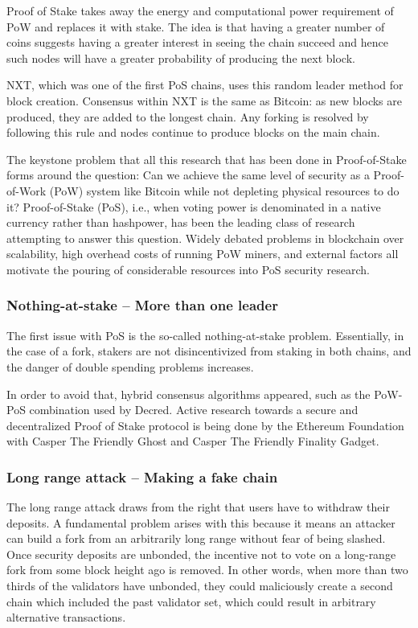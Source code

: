 \documentclass[a4paper]{article}
\begin{document}
	Proof of Stake takes away the energy and computational power requirement of PoW and replaces it with stake.\cite{ethfaq} The idea is that having a greater number of coins suggests having a greater interest in seeing the chain succeed and hence such nodes will have a greater probability of producing the next block.
	
	NXT, which was one of the first PoS chains, uses this random leader method for block creation. Consensus within NXT is the same as Bitcoin: as new blocks are produced, they are added to the longest chain. Any forking is resolved by following this rule and nodes continue to produce blocks on the main chain.
	
	The keystone problem that all this research that has been done in Proof-of-Stake forms around the question: Can we achieve the same level of security as a Proof-of-Work (PoW) system like Bitcoin while not depleting physical resources to do it? Proof-of-Stake (PoS), i.e., when voting power is denominated in a native currency rather than hashpower, has been the leading class of research attempting to answer this question. Widely debated problems in blockchain over scalability, high overhead costs of running PoW miners, and external factors all motivate the pouring of considerable resources into PoS security research.
	
	\subsubsection{Nothing-at-stake -- More than one leader}
	The first issue with PoS is the so-called nothing-at-stake problem. Essentially, in the case of a fork, stakers are not disincentivized from staking in both chains, and the danger of double spending\cite{bcirrtran} problems increases.
	
	In order to avoid that, hybrid consensus algorithms appeared, such as the PoW-PoS combination used by Decred. Active research towards a secure and decentralized Proof of Stake protocol is being done by the Ethereum Foundation with Casper The Friendly Ghost\cite{zamfir2017casper} and Casper The Friendly Finality Gadget\cite{buterin2017casper}.
	
	\subsubsection{Long range attack -- Making a fake chain}
	The long range attack draws from the right that users have to withdraw their deposits. A fundamental problem arises with this because it means an attacker can build a fork from an arbitrarily long range without fear of being slashed. Once security deposits are unbonded, the incentive not to vote on a long-range fork from some block height ago is removed. In other words, when more than two thirds of the validators have unbonded, they could maliciously create a second chain which included the past validator set, which could result in arbitrary alternative transactions.
	
\end{document}
